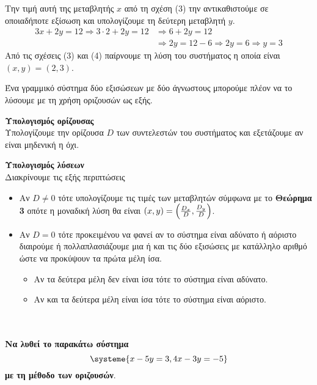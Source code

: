 \documentclass[twoside,nofonts,internet,methodoi]{thewria}
\DeclareRobustCommand{\frac}[3][0pt]{%
{\begingroup\hspace{#1}#2\hspace{#1}\endgroup\over\hspace{#1}#3\hspace{#1}}}
\begin{document}
Την τιμή αυτή της μεταβλητής $ x $ από τη σχέση (3) την αντικαθιστούμε σε οποιαδήποτε εξίσωση και υπολογίζουμε τη δεύτερη μεταβλητή $ y $.
\begin{equation}\begin{aligned}
3x+2y=12\Rightarrow 3\cdot2+2y=12&\Rightarrow 6+2y=12\\&\Rightarrow 2y=12-6\Rightarrow 2y=6\Rightarrow y=3\end{aligned}
\end{equation}
Από τις σχέσεις (3) και (4) παίρνουμε τη λύση του συστήματος η οποία είναι $ (x,y)=(2,3) $.
\begin{Methodos}
Ένα γραμμικό σύστημα δύο εξισώσεων με δύο άγνωστους μπορούμε πλέον να το λύσουμε με τη χρήση οριζουσών ως εξής.
\begin{bhma}
\item \textbf{Υπολογισμός ορίζουσας}\\
Υπολογίζουμε την ορίζουσα $ D $ των συντελεστών του συστήματος και εξετάζουμε αν είναι μηδενική η όχι.
\item \textbf{Υπολογισμός λύσεων}\\
Διακρίνουμε τις εξής περιπτώσεις
\begin{itemize}
\item Αν $ D\neq0 $ τότε υπολογίζουμε τις τιμές των μεταβλητών σύμφωνα με το \textbf{Θεώρημα 3} οπότε η μοναδική λύση θα είναι $ (x,y)=\left(\frac{D_x}{D},\frac{D_y}{D} \right) $.
\item Αν $ D=0 $ τότε προκειμένου να φανεί αν το σύστημα είναι αδύνατο ή αόριστο διαιρούμε ή πολλαπλασιάζουμε μια ή και τις δύο εξισώσεις με κατάλληλο αριθμό ώστε να προκύψουν τα πρώτα μέλη ίσα.
\begin{itemize}
\item Αν τα δεύτερα μέλη δεν είναι ίσα τότε το σύστημα είναι αδύνατο.
\item Αν και τα δεύτερα μέλη είναι ίσα τότε το σύστημα είναι αόριστο.
\end{itemize}
\end{itemize}
\end{bhma}
\end{Methodos}\mbox{}\\\\
\textbf{Να λυθεί το παρακάτω σύστημα}
{\boldmath\[ \systeme{x-5y=3,4x-3y=-5} \]}
\textbf{με τη μέθοδο των οριζουσών}.\\\\
\lysh\\
\end{document}
